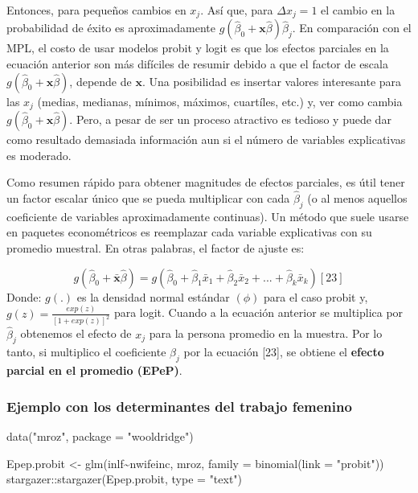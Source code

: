 \documentclass[
  letterpaper,
  DIV=11,
  numbers=noendperiod]{scrreprt}
\newenvironment{Shaded}{\begin{snugshade}}{\end{snugshade}}
\newcommand{\AttributeTok}[1]{\textcolor[rgb]{0.40,0.45,0.13}{#1}}
\newcommand{\FunctionTok}[1]{\textcolor[rgb]{0.28,0.35,0.67}{#1}}
\newcommand{\NormalTok}[1]{\textcolor[rgb]{0.00,0.23,0.31}{#1}}
\newcommand{\OtherTok}[1]{\textcolor[rgb]{0.00,0.23,0.31}{#1}}
\newcommand{\SpecialCharTok}[1]{\textcolor[rgb]{0.37,0.37,0.37}{#1}}
\newcommand{\StringTok}[1]{\textcolor[rgb]{0.13,0.47,0.30}{#1}}
\begin{document}
Entonces, para pequeños cambios en \(x_j\). Así que, para
\(\Delta x_j=1\) el cambio en la probabilidad de éxito es
aproximadamente \(g(\hat{\beta}_0+\mathbf{x}\hat{\beta})\hat{\beta}_j\).
En comparación con el MPL, el costo de usar modelos probit y logit es
que los efectos parciales en la ecuación anterior son más difíciles de
resumir debido a que el factor de escala
\(g(\hat{\beta}_0+\mathbf{x}\hat{\beta})\), depende de \(\mathbf{x}\).
Una posibilidad es insertar valores interesante para las \(x_j\)
(medias, medianas, mínimos, máximos, cuartíles, etc.) y, ver como cambia
\(g(\hat{\beta}_0+\mathbf{x}\hat{\beta})\). Pero, a pesar de ser un
proceso atractivo es tedioso y puede dar como resultado demasiada
información aun si el número de variables explicativas es moderado.

Como resumen rápido para obtener magnitudes de efectos parciales, es
útil tener un factor escalar único que se pueda multiplicar con cada
\(\widehat{\beta}_j\) (o al menos aquellos coeficiente de variables
aproximadamente continuas). Un método que suele usarse en paquetes
econométricos es reemplazar cada variable explicativas con su promedio
muestral. En otras palabras, el factor de ajuste es:

\[g(\hat{\beta}_0+\bar{\mathbf{x}}\hat{\beta})=g(\hat{\beta}_0+\hat{\beta}_1\bar{x}_1+\hat{\beta}_2\bar{x}_2+...+\hat{\beta}_k\bar{x}_k) [23]\]
Donde: \(g(.)\) es la densidad normal estándar \((\phi)\) para el caso
probit y, \(g(z)=\frac{exp(z)}{[1+exp(z)]^2}\) para logit. Cuando a la
ecuación anterior se multiplica por \(\widehat{\beta}_j\) obtenemos el
efecto de \(x_j\) para la persona promedio en la muestra. Por lo tanto,
si multiplico el coeficiente \(\beta_j\) por la ecuación {[}23{]}, se
obtiene el \textbf{efecto parcial en el promedio (EPeP)}.

\subsubsection{Ejemplo con los determinantes del trabajo
femenino}\label{ejemplo-con-los-determinantes-del-trabajo-femenino}

\begin{Shaded}
\begin{Highlighting}[]
\FunctionTok{data}\NormalTok{(}\StringTok{"mroz"}\NormalTok{, }\AttributeTok{package =} \StringTok{"wooldridge"}\NormalTok{)}

\NormalTok{Epep.probit }\OtherTok{\textless{}{-}} \FunctionTok{glm}\NormalTok{(inlf}\SpecialCharTok{\textasciitilde{}}\NormalTok{nwifeinc,}
\NormalTok{                  mroz, }
                  \AttributeTok{family =} \FunctionTok{binomial}\NormalTok{(}\AttributeTok{link =} \StringTok{"probit"}\NormalTok{)) }
\NormalTok{stargazer}\SpecialCharTok{::}\FunctionTok{stargazer}\NormalTok{(Epep.probit, }\AttributeTok{type =} \StringTok{"text"}\NormalTok{)}
\end{Highlighting}
\end{Shaded}
\end{document}
